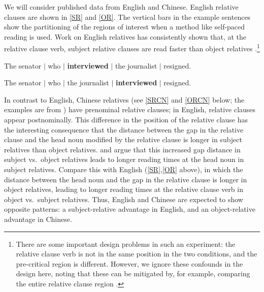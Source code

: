 \documentclass{ar-1col}\usepackage[]{graphicx}\usepackage[]{color}
\begin{document}
We will consider published data from English and Chinese. English relative clauses are shown in \ref{SR} and \ref{OR}. The vertical bars in the example sentences show the partitioning of the regions of interest when a method like self-paced reading is used. 
Work on English relatives  has consistently shown that, at the relative clause verb, subject relative clauses are read faster than object relatives  \citep[e.g.,][]{jc92,grodner,gibson2005rrc,gordon01,fedorenko2006nature}.\footnote{There are some important design problems in such an experiment: the relative clause verb is not in the same position in the two conditions, and the pre-critical region is different. However, we ignore these confounds in the design here, noting that these can be mitigated by, for example, comparing the entire relative clause region \citep{fedorenko2006nature}.}

\begin{exe}
\ex
\begin{xlist}
\item \label{SR}      
The senator $\mid$ who $\mid$ \textbf{interviewed} $\mid$ the journalist $\mid$ resigned.
\item \label{OR} 
The senator $\mid$ who $\mid$ the journalist $\mid$ \textbf{interviewed} $\mid$ resigned.
\end{xlist}
\end{exe}

In contrast to English, 
Chinese relatives (see \ref{SRCN} and \ref{ORCN} below; the examples are from \citet{gibsonwu}) have prenominal relative clauses; in English, relative clauses appear postnominally. This difference in the position of the relative clause has the interesting consequence that the distance between the gap in the relative clause and the head noun modified by the relative clause is longer in subject relatives than object relatives. \citet{hsiao03} and \citet{gibsonwu} argue that this increased gap distance in subject vs.\ object relatives leads to longer reading times at the head noun in subject relatives. Compare this with English (\ref{SR},\ref{OR} above), in which the distance between the head noun and the gap in the relative clause is longer in object relatives, leading to longer reading times at the relative clause verb in object vs.\ subject relatives. Thus, English and Chinese are expected to show opposite patterns: a subject-relative advantage in English, and an object-relative advantage in Chinese.
\end{document}
